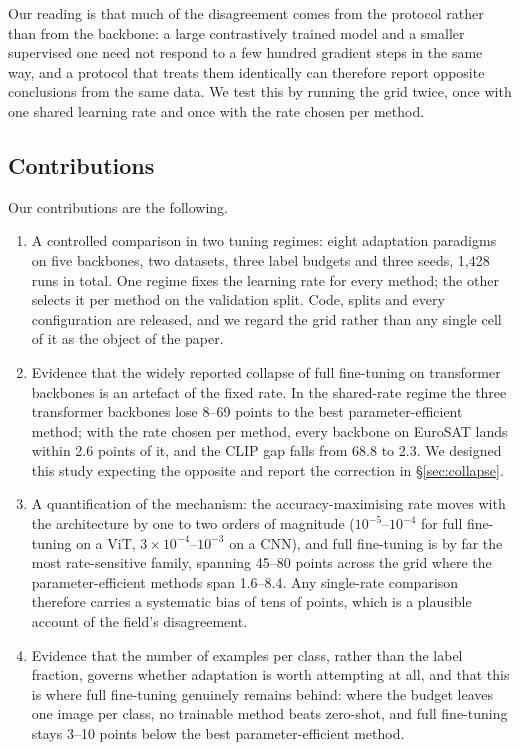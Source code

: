 \documentclass[preprint,12pt]{elsarticle}
\begin{document}
Our reading is that much of the disagreement comes from the protocol rather than
from the backbone: a large contrastively trained model and a smaller supervised
one need not respond to a few hundred gradient steps in the same way, and a
protocol that treats them identically can therefore report opposite conclusions
from the same data. We test this by running the grid twice, once with one shared
learning rate and once with the rate chosen per method.

\subsection{Contributions}

Our contributions are the following.

\begin{enumerate}
\item A controlled comparison in two tuning regimes: eight adaptation paradigms
on five backbones, two datasets, three label budgets and three seeds, 1{,}428
runs in total. One regime fixes the learning rate for every method; the other
selects it per method on the validation split. Code, splits and every
configuration are released, and we regard the grid rather than any single cell of
it as the object of the paper.

\item Evidence that the widely reported collapse of full fine-tuning on
transformer backbones is an artefact of the fixed rate. In the shared-rate
regime the three transformer backbones lose 8--69 points to the best
parameter-efficient method; with the rate chosen per method, every backbone on
EuroSAT lands within 2.6 points of it, and the CLIP gap falls from 68.8 to 2.3.
We designed this study expecting the opposite and report the correction in
\S\ref{sec:collapse}.

\item A quantification of the mechanism: the accuracy-maximising rate moves with
the architecture by one to two orders of magnitude ($10^{-5}$--$10^{-4}$ for full
fine-tuning on a ViT, $3\times10^{-4}$--$10^{-3}$ on a CNN), and full fine-tuning
is by far the most rate-sensitive family, spanning 45--80 points across the grid
where the parameter-efficient methods span 1.6--8.4. Any single-rate comparison
therefore carries a systematic bias of tens of points, which is a plausible
account of the field's disagreement.

\item Evidence that the number of examples per class, rather than the label
fraction, governs whether adaptation is worth attempting at all, and that this is
where full fine-tuning genuinely remains behind: where the budget leaves one
image per class, no trainable method beats zero-shot, and full fine-tuning stays
3--10 points below the best parameter-efficient method.


\end{enumerate}
\end{document}
